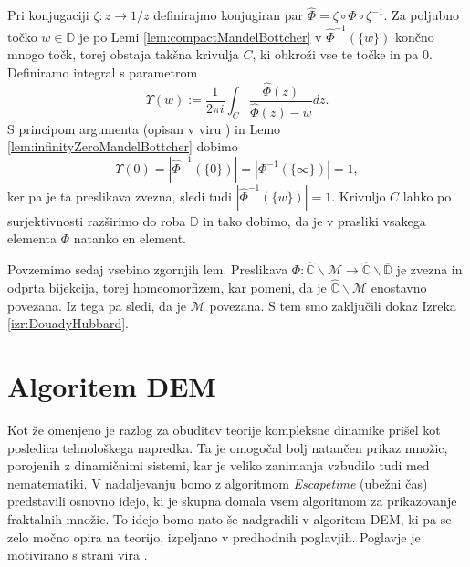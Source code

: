 \documentclass[12pt,a4paper]{amsart}
\theoremstyle{definition} %
\theoremstyle{plain} %
\newcommand{\CC}{\mathbb C}
\newcommand{\CCinf} {\hat{\CC}} %
\newcommand{\D}{\mathbb D} %
\newcommand{\M}{\mathscr M} %
\begin{document}
\proof
Pri konjugaciji $\zeta \colon z \to 1/z$ definirajmo konjugiran par $\hat{\Phi} = \zeta \circ \Phi \circ \zeta^{-1}$.
Za poljubno točko $w \in \D$ je po Lemi \ref{lem:compactMandelBottcher} 
v $\hat{\Phi}^{-1}(\{w\})$ končno mnogo točk, torej obstaja takšna krivulja $C$, ki obkroži vse te točke in pa $0$.
Definiramo integral s parametrom
$$\Upsilon(w) := \frac{1}{2\pi i}\int_{C}\frac{\hat{\Phi}(z)}{\hat{\Phi}(z) - w} dz.$$
S principom argumenta (opisan v viru \cite[Stran~123]{conway}) in Lemo \ref{lem:infinityZeroMandelBottcher} dobimo 
$$\Upsilon(0) =|\hat{\Phi}^{-1}(\{0\})| = |\Phi^{-1}(\{\infty\})| = 1,$$
ker pa je ta preslikava zvezna, sledi tudi $|\hat{\Phi}^{-1}(\{w\})| = 1$.
Krivuljo $C$ lahko po surjektivnosti razširimo do roba $\D$ in 
tako dobimo, da je v prasliki vsakega elementa $\Phi$ natanko en element.
\endproof

\noindent Povzemimo sedaj vsebino zgornjih lem.
Preslikava $\Phi \colon \CCinf \smallsetminus \M \to \CCinf \smallsetminus \overline{\D}$ je zvezna in odprta bijekcija, 
torej homeomorfizem, kar pomeni, da je $\CCinf \smallsetminus \M$ enostavno povezana.
Iz tega pa sledi, da je $\M$ povezana.
S tem smo zaključili dokaz Izreka \ref{izr:DouadyHubbard}.
\endproof

\section{Algoritem DEM} 
Kot že omenjeno je razlog za obuditev teorije kompleksne dinamike prišel kot posledica tehnološkega napredka.
Ta je omogočal bolj natančen prikaz množic, porojenih z dinamičnimi sistemi, kar je veliko zanimanja vzbudilo tudi med nematematiki.
V nadaljevanju bomo z algoritmom {\em Escapetime} (ubežni čas) predstavili osnovno idejo, ki je skupna domala vsem algoritmom za prikazovanje fraktalnih množic.
To idejo bomo nato še nadgradili v algoritem DEM, ki pa se zelo močno opira na teorijo, izpeljano v predhodnih poglavjih.
Poglavje je motivirano s strani vira \cite{wilson}.
\end{document}
